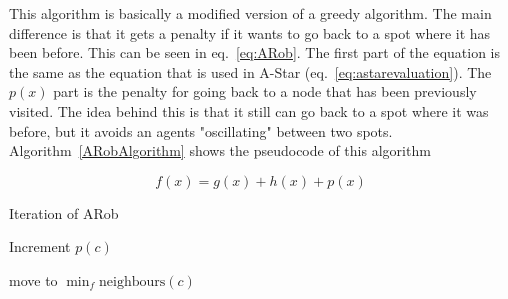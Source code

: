 This algorithm is basically a modified version of a greedy algorithm. The main difference is that it gets a penalty if it wants to go back to a spot where it has been before. This can be seen in eq.~\ref{eq:ARob}. The first part of the equation is the same as the equation that is used in A-Star (eq.~\ref{eq:astarevaluation}). The $p(x)$ part is the penalty for going back to a node that has been previously visited. The idea behind this is that it still can go back to a spot where it was before, but it avoids an agents "oscillating" between two spots. Algorithm~\ref{ARobAlgorithm} shows the pseudocode of this algorithm

\begin{equation}
	\label{eq:ARob}
 	f(x) = g(x) + h(x) + p(x)
\end{equation}


\begin{algorithm}
\label{ARobAlgorithm}
    \caption{Iteration of ARob}
    Increment $p(c)$\;
    
    move to $\min_f \mathrm{neighbours}(c)$
\end{algorithm}

        
        
        
        
        
    
